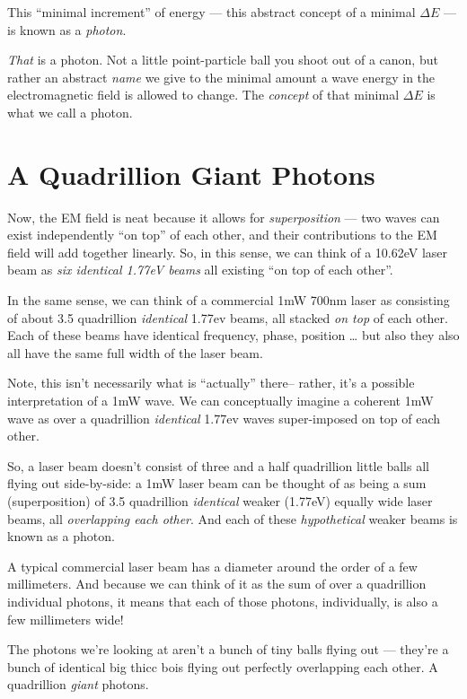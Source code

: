 \documentclass[]{article}
\begin{document}
This ``minimal increment'' of energy --- this abstract concept of a minimal
\(\Delta E\) --- is known as a \emph{photon}.

\emph{That} is a photon. Not a little point-particle ball you shoot out of a
canon, but rather an abstract \emph{name} we give to the minimal amount a wave
energy in the electromagnetic field is allowed to change. The \emph{concept} of
that minimal \(\Delta E\) is what we call a photon.

\hypertarget{a-quadrillion-giant-photons}{%
\section{A Quadrillion Giant Photons}\label{a-quadrillion-giant-photons}}

Now, the EM field is neat because it allows for \emph{superposition} --- two
waves can exist independently ``on top'' of each other, and their contributions
to the EM field will add together linearly. So, in this sense, we can think of a
10.62eV laser beam as \emph{six identical 1.77eV beams} all existing ``on top of
each other''.

In the same sense, we can think of a commercial 1mW 700nm laser as consisting of
about 3.5 quadrillion \emph{identical} 1.77ev beams, all stacked \emph{on top}
of each other. Each of these beams have identical frequency, phase, position
\ldots{} but also they also all have the same full width of the laser beam.

Note, this isn't necessarily what is ``actually'' there-- rather, it's a
possible interpretation of a 1mW wave. We can conceptually imagine a coherent
1mW wave as over a quadrillion \emph{identical} 1.77ev waves super-imposed on
top of each other.

So, a laser beam doesn't consist of three and a half quadrillion little balls
all flying out side-by-side: a 1mW laser beam can be thought of as being a sum
(superposition) of 3.5 quadrillion \emph{identical} weaker (1.77eV) equally wide
laser beams, all \emph{overlapping each other}. And each of these
\emph{hypothetical} weaker beams is known as a photon.

A typical commercial laser beam has a diameter around the order of a few
millimeters. And because we can think of it as the sum of over a quadrillion
individual photons, it means that each of those photons, individually, is also a
few millimeters wide!

The photons we're looking at aren't a bunch of tiny balls flying out --- they're
a bunch of identical big thicc bois flying out perfectly overlapping each other.
A quadrillion \emph{giant} photons.
\end{document}
